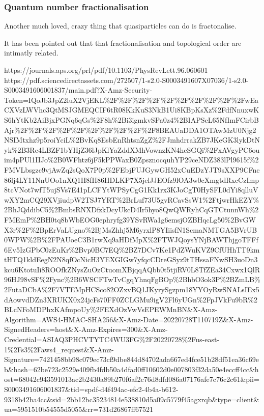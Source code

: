 {}

\hypertarget{quantum-number-fractionalisation}{%
\subsubsection{Quantum number
fractionalisation}\label{quantum-number-fractionalisation}}

Another much loved, crazy thing that quasiparticles can do is
fractonalise.

It has been pointed out that
\textcite{oshikawaFractionalizationTopologicalOrder2006} that
fractionalisation and topological order are intimatly related.

https://journals.aps.org/prl/pdf/10.1103/PhysRevLett.96.060601
https://pdf.sciencedirectassets.com/272507/1-s2.0-S0003491607X07036/1-s2.0-S0003491606001837/main.pdf?X-Amz-Security-Token=IQoJb3JpZ2luX2VjEKL\%2F\%2F\%2F\%2F\%2F\%2F\%2F\%2F\%2F\%2FwEaCXVzLWVhc3QtMSJGMEQCIF6tR08KkKuS3NkB1Ui8KBpKsXz\%2FdfNnuxwKS6hYtKb2AiBjxPGNq6qGs\%2F8h\%2Bi3igmkvSPa0z4\%2BIAPScL65NfImFCirbBAjr\%2F\%2F\%2F\%2F\%2F\%2F\%2F\%2F\%2F\%2F8BEAUaDDA1OTAwMzU0Njg2NSIMtxhz9p5roiYciL\%2BvKq8EsbEnRhtsnZgZ\%2FJmhdrrakZB7JKeGK3lykDtNyk\%2B3Re4LBZF1bYHjZ36lJpKlYaZddXMhVownzKN4hcSGQi\%2FxAVgyPC6ouim4pPUl1IIJo\%2B0WFhtz6jF5kPPWaxB0ZpsznocquhYP29ceNDZ383lPl9615f\%2FMVLbsgzc9vjAwZq2sQoX7P0p\%2FEbjFUJGywGH52xCuEDzYJT9sXXP9CFnc86lj4LY11NnUOo1nXQ1H8fH86HDLKP7X5jelJJEOfz9lOA3w0cXmgtdRxcCzImp8tcVNot7wfT5ujSVs7E41pLCFYtWPSyCgG1Kk1rx3KJoCgT0HySFL0dYi8qlluVwXY2mCQ29XVjiudpW2TSJ7YRT\%2BrLuf73U5gvRCavSsW1\%2FtjwrHkEZY\%2BhJQddibC5\%2BmbsRNXDfzkDcyUkcD4Ir5hyo8QwQWRyhCqGTCtunnWh\%2FMEmP\%2BH0tq8bWbEOG0ephryfg39YSvRWa1g6emsjOZBHqcLg50\%2BvGWX3r\%2F\%2BpErVaLUgno\%2BjMsZhhj5M6yrxlP8YIiisfN1ScmaNMTGA5BVrUB0WPW\%2B\%2FPAUoeC3B1rwXq9aHDfMpX\%2FTWJQoysYNjBAWThjgoTFFf6Ev5IzGPbC0zEuKr\%2Bvp0BC7EQ\%2BZ7DCv7Ke1PdZWuKVZ9CfUHhTT9kmtHTQ1kldEegN2N8qfOcNicH3YEXGIGw7yfqcCDreGSyz9tTHssaFNwSH3uoDn3kcu6KtotuIi8ROOfkZNysZuOzCtuomXBjqqAQbb0t5tjiRV0L8TfZEa34Cxwx1QlR96HJ98vSF\%2Fync\%2B6WSCFTwTvCgqYhnqFgBOp\%2BhbO3ok3P\%2BZmLB\%2FutaDCbA\%2F7VTEMpHCSco82OZxvBQ1JKyrySgzpm18YYOyRwSNALsIEx5dAowvdDZn3XRUKX0x24jcFs70FF0ZCLGMu9igV2Fl6yUGn\%2FpJVkFu9bR\%2BLcNFoMDPhxKAfmpoUy\%2FEXdOzVwVsEPEWMnBN\&X-Amz-Algorithm=AWS4-HMAC-SHA256\&X-Amz-Date=20220728T110719Z\&X-Amz-SignedHeaders=host\&X-Amz-Expires=300\&X-Amz-Credential=ASIAQ3PHCVTYTC4WU3FG\%2F20220728\%2Fus-east-1\%2Fs3\%2Faws4\_request\&X-Amz-Signature=7421458bb98c079ec73cf9dbe844d84702ada667ed4fce51b28df51ea36c69eb\&hash=62be723c2529e409fb4fdb50a4dfad0ff10602d0e007803f32da50e4eccff4cc\&host=68042c943591013ac2b2430a89b270f6af2c76d8dfd086a07176afe7c76c2c61\&pii=S0003491606001837\&tid=spdf-d4f494ac-efc2-4b4a-b612-9318b42ba4cc\&sid=2bb12bc35234814e538810d5a09c5779f45agxrqb\&type=client\&ua=5951510b54555d5055\&rr=731d26867ff67521

